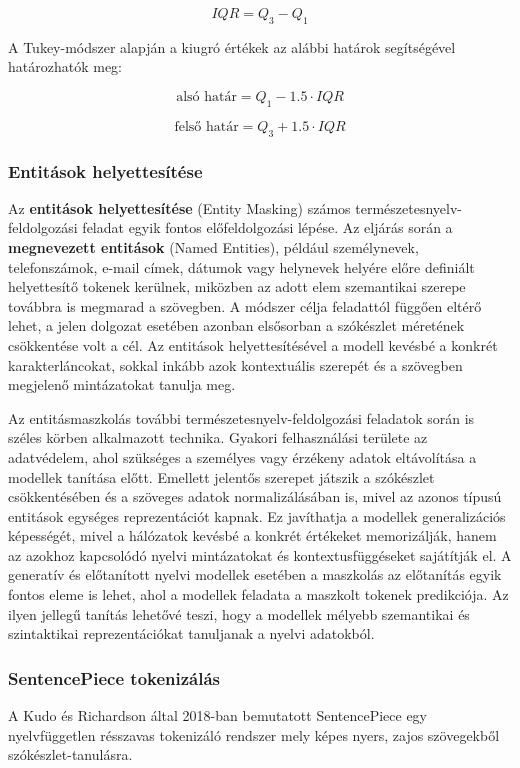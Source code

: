 \[
IQR = Q_3 - Q_1
\]

A Tukey-módszer alapján a kiugró értékek az alábbi határok segítségével határozhatók meg:

\[
\text{alsó határ} = Q_1 - 1.5 \cdot IQR
\]

\[
\text{felső határ} = Q_3 + 1.5 \cdot IQR
\]

\subsubsection{Entitások helyettesítése}

Az \textbf{entitások helyettesítése} (Entity Masking) számos természetesnyelv-feldolgozási feladat egyik fontos előfeldolgozási lépése.
Az eljárás során a \textbf{megnevezett entitások} (Named Entities), például személynevek, telefonszámok, e-mail címek, dátumok vagy helynevek helyére előre definiált helyettesítő tokenek kerülnek, miközben az adott elem szemantikai szerepe továbbra is megmarad a szövegben.
A módszer célja feladattól függően eltérő lehet, a jelen dolgozat esetében azonban elsősorban a szókészlet méretének csökkentése volt a cél.
Az entitások helyettesítésével a modell kevésbé a konkrét karakterláncokat, sokkal inkább azok kontextuális szerepét és a szövegben megjelenő mintázatokat tanulja meg.

Az entitásmaszkolás további természetesnyelv-feldolgozási feladatok során is széles körben alkalmazott technika.
Gyakori felhasználási területe az adatvédelem, ahol szükséges a személyes vagy érzékeny adatok eltávolítása a modellek tanítása előtt.
Emellett jelentős szerepet játszik a szókészlet csökkentésében és a szöveges adatok normalizálásában is, mivel az azonos típusú entitások egységes reprezentációt kapnak.
Ez javíthatja a modellek generalizációs képességét, mivel a hálózatok kevésbé a konkrét értékeket memorizálják, hanem az azokhoz kapcsolódó nyelvi mintázatokat és kontextusfüggéseket sajátítják el.
A generatív és előtanított nyelvi modellek esetében a maszkolás az előtanítás egyik fontos eleme is lehet, ahol a modellek feladata a maszkolt tokenek predikciója.
Az ilyen jellegű tanítás lehetővé teszi, hogy a modellek mélyebb szemantikai és szintaktikai reprezentációkat tanuljanak a nyelvi adatokból.

\subsubsection{SentencePiece tokenizálás}

A Kudo és Richardson által 2018-ban bemutatott SentencePiece egy nyelvfüggetlen résszavas tokenizáló rendszer mely képes nyers, zajos szövegekből 
szókészlet-tanulásra.

